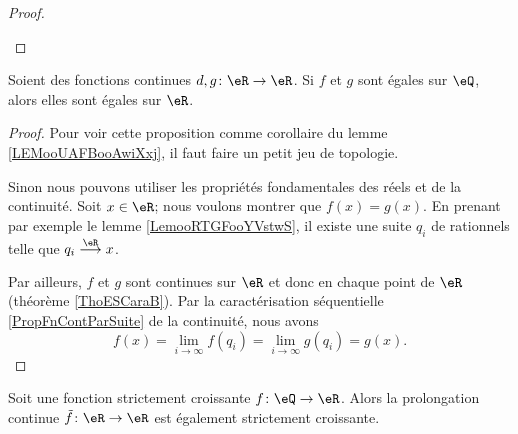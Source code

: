 \begin{proof}
\begin{subproof}
    \end{subproof}
\end{proof}

\begin{proposition}     \label{PROPooXWHYooFiVYfi}
    Soient des fonctions continues \( d,g\colon \eR\to \eR\). Si \( f\) et \( g\) sont égales sur \( \eQ\), alors elles sont égales sur \( \eR\).
\end{proposition}

\begin{proof}
    Pour voir cette proposition comme corollaire du lemme \ref{LEMooUAFBooAwiXxj}, il faut faire un petit jeu de topologie.

    Sinon nous pouvons utiliser les propriétés fondamentales des réels et de la continuité. Soit \( x\in \eR\); nous voulons montrer que \( f(x)=g(x)\). En prenant par exemple le lemme \ref{LemooRTGFooYVstwS}, il existe une suite \( q_i\) de rationnels telle que \( q_i\stackrel{\eR}{\longrightarrow}x\). 
    
    Par ailleurs, \( f\) et \( g\) sont continues sur \( \eR\) et donc en chaque point de \( \eR\) (théorème \ref{ThoESCaraB}). Par la caractérisation séquentielle \ref{PropFnContParSuite} de la continuité, nous avons
    \begin{equation}
        f(x)=\lim_{i\to \infty} f(q_i)=\lim_{i\to \infty} g(q_i)=g(x).
    \end{equation}
\end{proof}

\begin{proposition}      \label{PROPooTNIAooNAJDzL}
    Soit une fonction strictement croissante \( f\colon \eQ\to \eR\). Alors la prolongation continue \( \tilde f\colon \eR\to \eR\) est également strictement croissante.
\end{proposition}

